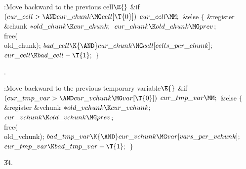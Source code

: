 \B{}:Move  backward to the previous cell\X${}\E{}$\6
\&{if} ${}(\\{cur\_cell}>{\AND}\\{cur\_chunk}\MG\\{cell}[\T{0}]){}$\1\5
${}\\{cur\_cell}\MM;{}$\2\6
\&{else}\5
${}\{{}$\1\6
\&{register} \&{chunk} ${}{*}\\{old\_chunk}\K\\{cur\_chunk};{}$\7
${}\\{cur\_chunk}\K\\{old\_chunk}\MG\\{prev}{}$;\5
\\{free}(\\{old\_chunk});\6
${}\\{bad\_cell}\K{\AND}\\{cur\_chunk}\MG\\{cell}[\\{cells\_per\_chunk}];{}$\6
${}\\{cur\_cell}\K\\{bad\_cell}-\T{1};{}$\6
\4${}\}{}$\2\par
{}.\fi

\B{}:Move  backward to the previous temporary
variable\X${}\E{}$\6
\&{if} ${}(\\{cur\_tmp\_var}>{\AND}\\{cur\_vchunk}\MG\\{var}[\T{0}]){}$\1\5
${}\\{cur\_tmp\_var}\MM;{}$\2\6
\&{else}\5
${}\{{}$\1\6
\&{register} \&{vchunk} ${}{*}\\{old\_vchunk}\K\\{cur\_vchunk};{}$\7
${}\\{cur\_vchunk}\K\\{old\_vchunk}\MG\\{prev}{}$;\5
\\{free}(\\{old\_vchunk});\6
${}\\{bad\_tmp\_var}\K{\AND}\\{cur\_vchunk}\MG\\{var}[\\{vars\_per%
\_vchunk}];{}$\6
${}\\{cur\_tmp\_var}\K\\{bad\_tmp\_var}-\T{1};{}$\6
\4${}\}{}$\2\par
\U34.\fi

